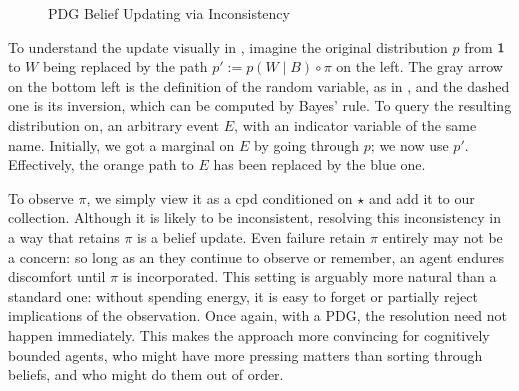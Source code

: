 \documentclass{article}
\theoremstyle{plain}
\theoremstyle{definition}
\theoremstyle{remark}
\newcommand{\MN}{PDG}
\numberwithin{equation}{section}
\begin{document}
	
	\begin{figure}[htb]
		\centering
%				
%				
		\caption{PDG Belief Updating via Inconsistency}
		\label{fig:belief-update}
	\end{figure}
	
	To understand the update visually in , imagine the original distribution $p$ from $\sf 1$ to $W$ being replaced by the path $p' := p(W \mid B) \circ \pi$  on the left. The gray arrow on the bottom left is the definition of the random variable, as in , and the dashed one is its inversion, which can be computed by Bayes' rule.  %
	To query the resulting distribution on, an arbitrary event $E$, with an indicator variable of the same name. Initially, we got a marginal on $E$ by going through $p$; we now use $p'$. Effectively, the orange path to $E$ has been replaced by the blue one.

	
	To observe $\pi$, we simply view it as a cpd conditioned on $\star$ and add it to our collection. 
	Although it is likely to be inconsistent, resolving this inconsistency in a way that retains $\pi$ is a belief update. 
	Even failure retain $\pi$ entirely may not be a concern: so long as an they continue to observe or remember, an agent endures discomfort until $\pi$ is incorporated. This setting is arguably more natural than a standard one: without spending energy, it is easy to forget or partially reject implications of the observation.	
	Once again, with a \MN, the resolution need not happen immediately. This makes the approach more convincing for cognitively bounded agents, who might have more pressing matters than sorting through beliefs, and who might do them out of order.
\end{document}
